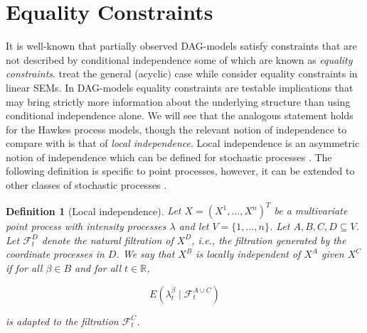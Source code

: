 \documentclass[accepted]{uai2021} %
\newtheorem{defn}[thm]{Definition}
\begin{document}

\section{Equality Constraints}


It is well-known that partially observed DAG-models satisfy 
constraints that 
are not described by conditional independence some of which are known as 
\emph{equality constraints}. \cite{richardson2017} treat the general (acyclic) 
case 
while \cite{chen2014, chenNIPS2016} consider equality constraints in linear 
SEMs. In DAG-models equality constraints are testable implications that may 
bring strictly more information about the underlying structure than using 
conditional independence alone. We will see that the analogous statement holds 
for the Hawkes process models, though the relevant notion of independence to 
compare with is 
that of \emph{local independence}. Local independence is an asymmetric notion 
of independence which can be defined 
for stochastic processes \citep{schweder1970, aalen1987, didelez2000, 
didelez2008}. The following definition is specific to point processes, however, 
it can be extended to other classes of stochastic processes 
\citep{aalen1987,didelez2006,mogensenUAI2018,mogensen2018}.

\begin{defn}[Local independence]
	Let $X = (X^1,\ldots,X^n)^T$ be a multivariate point process with intensity 
	processes $\lambda$ and let $V=\{1,\ldots,n\}$. Let $A,B,C,D \subseteq V$. 
	Let $\mathcal{F}_t^D$ denote the natural filtration of $X^D$, i.e., the 
	filtration generated by the coordinate processes in $D$. We say that $X^B$ 
	is \emph{locally independent of $X^A$ given $X^C$} if for all $\beta\in B$ 
	and 
	for all $t\in \mathbb{R}$,
	
	$$
	E(\lambda_t^\beta \mid \mathcal{F}_t^{A\cup C})
	$$
	
	is adapted to the filtration $\mathcal{F}_t^C$.
	\label{def:li}
\end{defn}
\end{document}
